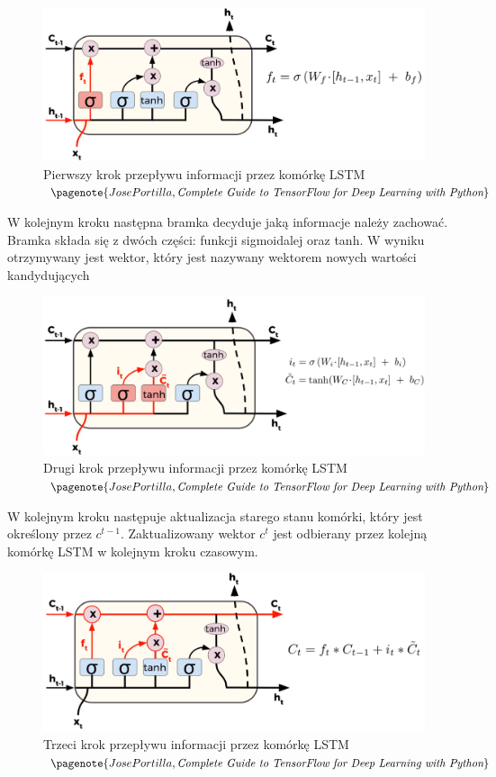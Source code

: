 	\begin{figure}[H]
		\centering
		\includegraphics[width=0.7\linewidth]{lstm_forget}
		\caption{Pierwszy krok przepływu informacji przez komórkę LSTM $\pagenote{Jose Portilla, \textit{Complete Guide to TensorFlow for Deep Learning with Python}}$}
		\label{fig:lstmforget}
	\end{figure}
	
	W kolejnym kroku następna bramka decyduje jaką informacje należy zachować. Bramka składa się z dwóch części: funkcji sigmoidalej oraz tanh. W wyniku otrzymywany jest wektor, który jest nazywany wektorem nowych wartości kandydujących
	
	\begin{figure}[H]
		\centering
		\includegraphics[width=0.7\linewidth]{lstm_2_krok}
		\caption{Drugi krok przepływu informacji przez komórkę LSTM $\pagenote{Jose Portilla, \textit{Complete Guide to TensorFlow for Deep Learning with Python}}$}
		\label{fig:lstm2krok}
	\end{figure}

	W kolejnym kroku następuje aktualizacja starego stanu komórki, który jest określony przez $c^{t-1}$. Zaktualizowany wektor $c^{t}$ jest odbierany przez kolejną komórkę LSTM w kolejnym kroku czasowym.

	\begin{figure}[H]
		\centering
		\includegraphics[width=0.7\linewidth]{lstm_3_krok}
		\caption{Trzeci krok przepływu informacji przez komórkę LSTM $\pagenote{Jose Portilla, \textit{Complete Guide to TensorFlow for Deep Learning with Python}}$}
		\label{fig:lstm3krok}
	\end{figure}

